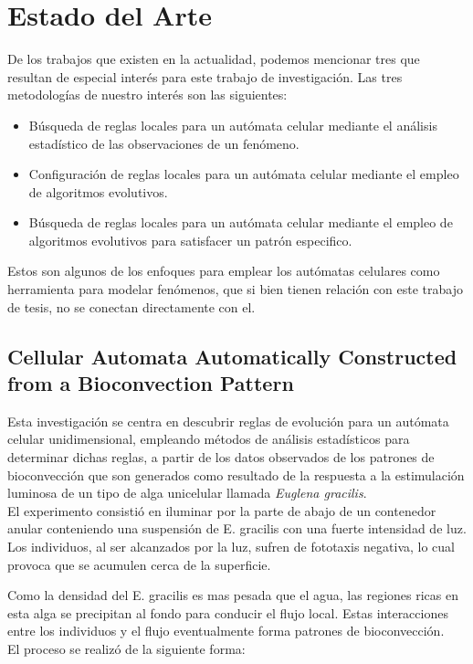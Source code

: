 \chapter{Estado del Arte}

De los trabajos que existen en la actualidad, podemos mencionar tres que resultan de especial interés para este trabajo de investigación. Las tres metodologías de nuestro interés son las siguientes:
\begin{itemize}
	\item Búsqueda de reglas locales para un autómata celular mediante el análisis estadístico de las observaciones de un fenómeno.
	\item Configuración de reglas locales para un autómata celular mediante el empleo de algoritmos evolutivos.
	\item Búsqueda de reglas locales para un autómata celular mediante el empleo de algoritmos evolutivos para satisfacer un patrón especifico.
\end{itemize}

Estos son algunos de los enfoques para emplear los autómatas celulares como herramienta para modelar fenómenos, que si bien tienen relación con este trabajo de tesis, no se conectan directamente con el.

\section{Cellular Automata Automatically Constructed from a Bioconvection Pattern}

Esta investigación \citep{kawaharada2016cellular} se centra en descubrir reglas de evolución para un autómata celular unidimensional, empleando métodos de análisis estadísticos para determinar dichas reglas, a partir de los datos observados de los patrones de bioconvección que son generados como resultado de la respuesta a la estimulación luminosa de un tipo de alga unicelular llamada \emph{Euglena gracilis}.
\\
El experimento consistió en iluminar por la parte de abajo de un contenedor anular conteniendo una suspensión de E. gracilis con una fuerte intensidad de luz. Los individuos, al ser alcanzados por la luz, sufren de fototaxis negativa, lo cual provoca que se acumulen cerca de la superficie.

Como la densidad del E. gracilis es mas pesada que el agua, las regiones ricas en esta alga se precipitan al fondo para conducir el flujo local. Estas interacciones entre los individuos y el flujo eventualmente forma patrones de bioconvección.
\\
El proceso se realizó de la siguiente forma:

